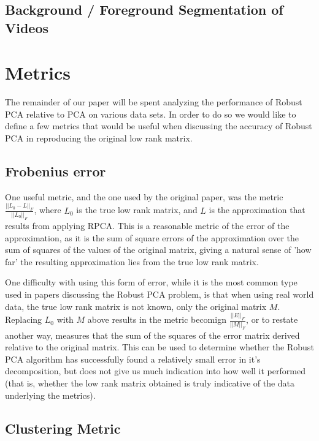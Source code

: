 \documentclass[11pt]{scrartcl} %
\theoremstyle{plain}
\begin{document}
\subsection{Background / Foreground Segmentation of Videos}


\section{Metrics}
The remainder of our paper will be spent analyzing the performance of Robust PCA relative to PCA on various data sets. In order to do so we would like to define a few metrics that would be useful when discussing the accuracy of Robust PCA in reproducing the original low rank matrix.

\subsection{Frobenius error}
One useful metric, and the one used by the original paper, was the metric $\frac{||L_0 - L||_F}{||L_0||_F}$, where $L_0$ is the true low rank matrix, and $L$ is the approximation that results from applying RPCA. This is a reasonable metric of the error of the approximation, as it is the sum of square errors of the approximation over the sum of squares of the values of the original matrix, giving a natural sense of 'how far' the resulting approximation lies from the true low rank matrix.

One difficulty with using this form of error, while it is the most common type used in papers discussing the Robust PCA problem, is that when using real world data, the true low rank matrix is not known, only the original matrix $M$. Replacing $L_0$ with $M$ above results in the metric becomign $\frac{||E||_F}{||M||_F}$, or to restate another way, measures that the sum of the squares of the error matrix derived relative to the original matrix. This can be used to determine whether the Robust PCA algorithm has successfully found a relatively small error in it's decomposition, but does not give us much indication into how well it performed (that is, whether the low rank matrix obtained is truly indicative of the data underlying the metrics).

\subsection{Clustering Metric}
\end{document}
